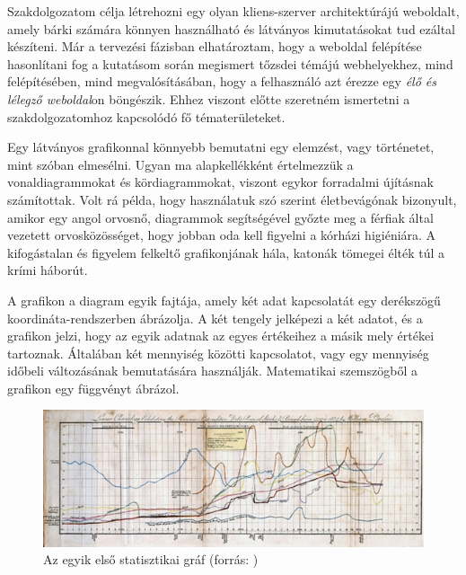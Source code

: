 
Szakdolgozatom célja létrehozni egy olyan kliens-szerver architektúrájú weboldalt, \\ 
amely bárki számára könnyen használható és látványos kimutatásokat tud ezáltal készíteni. Már a tervezési fázisban elhatároztam, hogy a weboldal felépítése hasonlítani fog a kutatásom során megismert tőzsdei témájú webhelyekhez, mind felépítésében, mind megvalósításában, hogy a felhasználó azt érezze egy\textit{ élő és lélegző weboldal}on böngészik. Ehhez viszont előtte szeretném ismertetni a szakdolgozatomhoz kapcsolódó fő tématerületeket.


Egy látványos grafikonnal könnyebb bemutatni egy elemzést, vagy történetet, mint szóban elmesélni. Ugyan ma alapkellékként értelmezzük a vonaldiagrammokat és kördiagrammokat, viszont egykor forradalmi újításnak számítottak. Volt rá példa, hogy használatuk szó szerint életbevágónak bizonyult, amikor egy angol orvosnő, diagrammok segítségével győzte meg a férfiak által vezetett orvosközösséget, hogy jobban oda kell figyelni a kórházi higiéniára. A kifogástalan és figyelem felkeltő grafikonjának hála, katonák tömegei élték túl a krími háborút.  \cite{portfolio}

	A grafikon a diagram egyik fajtája, amely két adat kapcsolatát egy derékszögű koordináta-rendszerben ábrázolja. A két tengely jelképezi a két adatot, és a grafikon jelzi, hogy az egyik adatnak az egyes értékeihez a másik mely értékei tartoznak. Általában két mennyiség közötti kapcsolatot, vagy egy mennyiség időbeli változásának bemutatására használják. Matematikai szemszögből a grafikon egy függvényt ábrázol. \cite{wikiMatek}

\begin{figure}[h]
\centering
\includegraphics[scale=0.8]{images/historyOfGraphs}
\caption{Az egyik első statisztikai gráf (forrás: \cite{oldGraph})}
\end{figure}

